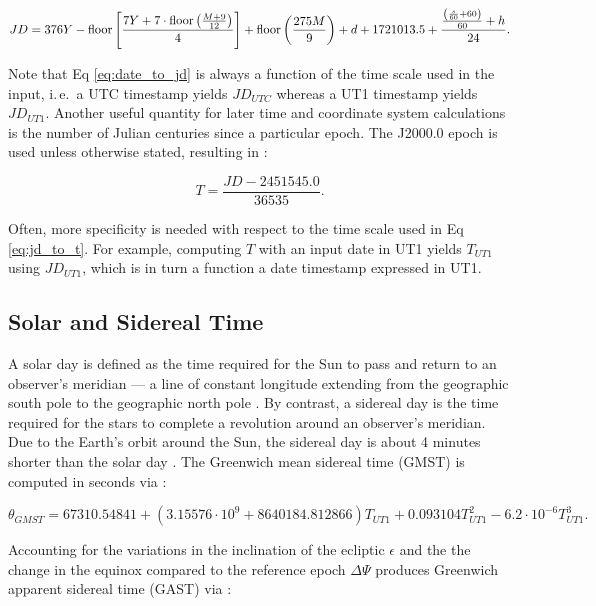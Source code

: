 \begin{equation} \label{eq:date_to_jd}
  JD = 376Y - \operatorname{floor}{\left[ \frac{7Y + 7 \cdot \operatorname{floor}{\left(\frac{M + 9}{12} \right)}}{4} \right]}
      + \operatorname{floor}{\left(\frac{275M}{9}\right)} 
      + d
      + 1721013.5
      + \frac{\frac{\left(\frac{s}{60} + 60\right)}{60} + h}{24}.
\end{equation}

Note that Eq \ref{eq:date_to_jd} is always a function of the time scale used in the input, i.\,e.\, a UTC timestamp yields $JD_{UTC}$ whereas a UT1 timestamp yields $JD_{UT1}$. Another useful quantity for later time and coordinate system calculations is the number of Julian centuries since a particular epoch. The J2000.0 epoch is used unless otherwise stated, resulting in \cite{vallado4ed}:

\begin{equation} \label{eq:jd_to_t}
  T = \frac{JD - 2451545.0}{36535}.
\end{equation}

Often, more specificity is needed with respect to the time scale used in Eq \ref{eq:jd_to_t}. For example, computing $T$ with an input date in UT1 yields $T_{UT1}$ using $JD_{UT1}$, which is in turn a function a date timestamp expressed in UT1. 

\subsection{Solar and Sidereal Time}

A solar day is defined as the time required for the Sun to pass and return to an observer's meridian --- a line of constant longitude extending from the geographic south pole to the geographic north pole \cite{vallado4ed}. By contrast, a sidereal day is the time required for the stars to complete a revolution around an observer's meridian. Due to the Earth's orbit around the Sun, the sidereal day is about 4 minutes shorter than the solar day \cite{vallado4ed}. The Greenwich mean sidereal time (GMST) is computed in seconds via \cite{frueh2019notes}:

\begin{equation} \label{eq:date_to_gmst}
  \theta_{GMST} = 67310.54841
        + \left(3.15576 \cdot 10^9 + 8640184.812866 \right) T_{UT1}
        + 0.093104 T_{UT1}^2
        - 6.2 \cdot 10^{-6} T_{UT1}^3.
\end{equation}

Accounting for the variations in the inclination of the ecliptic $\epsilon$ and the the change in the equinox compared to the reference epoch $\Delta \Psi$ produces Greenwich apparent sidereal time (GAST) via \cite{frueh2019notes}:


